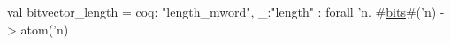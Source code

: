 val bitvector_length = {coq: "length_mword", _:"length"} : forall 'n. #\hyperref[zbits]{bits}#('n) -> atom('n)
